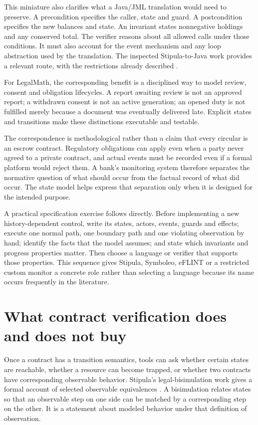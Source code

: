 \documentclass[12pt,a4paper,oneside,openany]{book}
\begin{document}
This miniature also clarifies what a Java/JML translation would need to preserve.
A precondition specifies the caller, state and guard. A postcondition specifies
the new balances and state. An invariant states nonnegative holdings and any
conserved total. The verifier reasons about all allowed calls under those
conditions. It must also account for the event mechanism and any loop abstraction
used by the translation. The inspected Stipula-to-Java work provides a relevant
route, with the restrictions already described \citep{stipulakey2025}.

For LegalMath, the corresponding benefit is a disciplined way to model review,
consent and obligation lifecycles. A report awaiting review is not an approved
report; a withdrawn consent is not an active generation; an opened duty is not
fulfilled merely because a document was eventually delivered late. Explicit
states and transitions make these distinctions executable and testable.

The correspondence is methodological rather than a claim that every circular is
an escrow contract. Regulatory obligations can apply even when a party never
agreed to a private contract, and actual events must be recorded even if a formal
platform would reject them. A bank's monitoring system therefore separates the
normative question of what should occur from the factual record of what did
occur. The state model helps express that separation only when it is designed
for the intended purpose.

A practical specification exercise follows directly. Before implementing a new
history-dependent control, write its states, actors, events, guards and effects;
execute one normal path, one boundary path and one violating observation by hand;
identify the facts that the model assumes; and state which invariants and progress
properties matter. Then choose a language or verifier that supports those
properties. This sequence gives Stipula, Symboleo, eFLINT or a restricted custom
monitor a concrete role rather than selecting a language because its name occurs
frequently in the literature.

\section{What contract verification does and does not buy}
\label{sec:languages-contractverification}
Once a contract has a transition semantics, tools can ask whether certain
states are reachable, whether a resource can become trapped, or whether two
contracts have corresponding observable behavior. Stipula's legal-bisimulation
work gives a formal account of selected observable equivalences
\citep[behavioral equivalence section]{stipula2021}. A bisimulation relates
states so that an observable step on one side can be matched by a corresponding
step on the other. It is a statement about modeled behavior under that
definition of observation.
\end{document}
